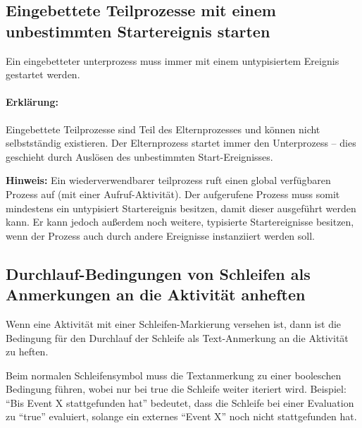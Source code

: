\documentclass[12pt,report]{../../Templates/snetTeaching}
\begin{document}
\begin{Rahmen}
	\hfill
\end{Rahmen}

\pagebreak
\subsection{Eingebettete Teilprozesse mit einem unbestimmten Startereignis starten}

Ein eingebetteter \Gls{unterprozess} muss immer mit einem untypisiertem Ereignis gestartet werden. 

\begin{Rahmen}
	\hfill
\end{Rahmen}

\paragraph{Erklärung:} Eingebettete Teilprozesse sind Teil des Elternprozesses und können nicht selbstständig existieren. Der Elternprozess startet immer den Unterprozess -- dies geschieht durch Auslösen des unbestimmten Start-Ereignisses.

\textbf{Hinweis:} Ein wiederverwendbarer \gls{teilprozess} ruft einen global verfügbaren Prozess auf (mit einer Aufruf-Aktivität). Der aufgerufene Prozess muss somit mindestens ein \gls{untypisiert} Startereignis besitzen, damit dieser ausgeführt werden kann. Er kann jedoch außerdem noch weitere, typisierte Startereignisse besitzen, wenn der Prozess auch durch andere Ereignisse instanziiert werden soll.


\subsection{Durchlauf-Bedingungen von Schleifen als Anmerkungen an die Aktivität anheften}

Wenn eine Aktivität mit einer Schleifen-Markierung versehen ist, dann ist die Bedingung für den Durchlauf der Schleife als Text-Anmerkung an die Aktivität zu heften. 

Beim normalen Schleifensymbol muss die Textanmerkung zu einer booleschen Bedingung führen, wobei nur bei true die Schleife weiter iteriert wird. Beispiel: "`Bis Event X stattgefunden hat"' bedeutet, dass die Schleife bei einer Evaluation zu "`true"' evaluiert, solange ein externes "`Event X"' noch nicht stattgefunden hat.
\end{document}
